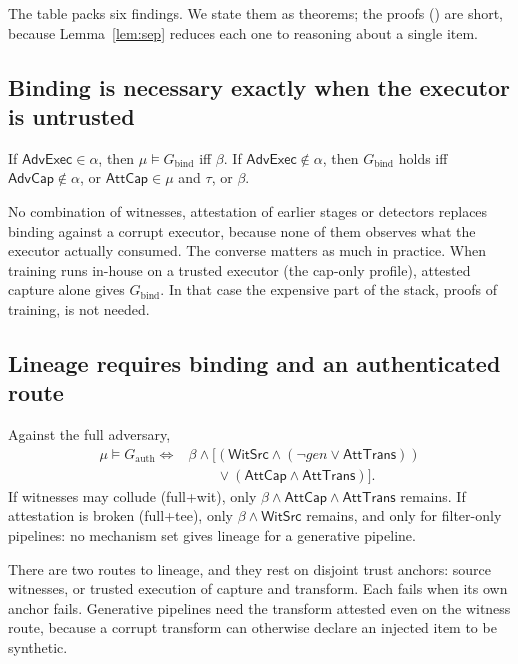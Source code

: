 The table packs six findings. We state them as theorems; the proofs (\proofsloc)
are short, because Lemma~\ref{lem:sep} reduces each one to reasoning about a single item.

\subsection{Binding is necessary exactly when the executor is untrusted}

\begin{theorem}[Binding]\label{thm:bind}
If $\textsf{AdvExec}\in\alpha$, then $\mu\models G_{\mathrm{bind}}$ iff
$\beta$. If $\textsf{AdvExec}\notin\alpha$, then $G_{\mathrm{bind}}$ holds iff
$\textsf{AdvCap}\notin\alpha$, or $\textsf{AttCap}\in\mu$ and $\tau$, or $\beta$.
\end{theorem}

No combination of witnesses, attestation of earlier stages or detectors replaces binding
against a corrupt executor, because none of them observes what the executor actually
consumed. The converse matters as much in practice. When training runs in-house on a
trusted executor (the cap-only profile), attested capture alone gives $G_{\mathrm{bind}}$.
In that case the expensive part of the stack, proofs of training, is not needed.

\subsection{Lineage requires binding and an authenticated route}

\begin{theorem}\label{thm:auth}
Against the full adversary,
\begin{align*}
\mu\models G_{\mathrm{auth}}\iff{}& \beta\wedge\big[(\textsf{WitSrc}\wedge(\neg\mathit{gen}\vee\textsf{AttTrans}))\\
&\qquad\vee(\textsf{AttCap}\wedge\textsf{AttTrans})\big].
\end{align*}
If witnesses may collude (full+wit), only $\beta\wedge\textsf{AttCap}\wedge\textsf{AttTrans}$
remains. If attestation is broken (full+tee), only $\beta\wedge\textsf{WitSrc}$ remains, and
only for filter-only pipelines: no mechanism set gives lineage for a generative pipeline.
\end{theorem}

There are two routes to lineage, and they rest on disjoint trust anchors: source
witnesses, or trusted execution of capture and transform. Each fails when its own anchor
fails. Generative pipelines need the transform attested even on the witness route, because
a corrupt transform can otherwise declare an injected item to be synthetic.

